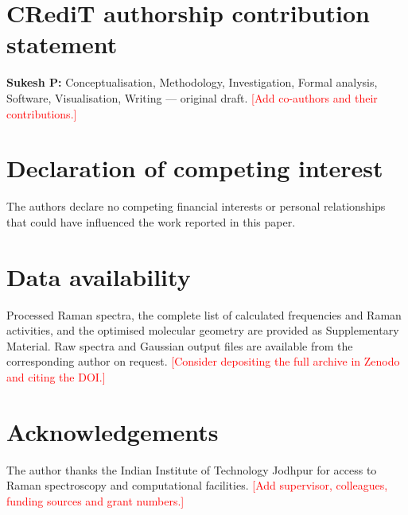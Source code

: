 \documentclass[11pt,a4paper]{article}
\newcommand{\authorcheck}[1]{\textcolor{red}{[#1]}}
\begin{document}
\section*{CRediT authorship contribution statement}
\textbf{Sukesh P:} Conceptualisation, Methodology, Investigation, Formal
analysis, Software, Visualisation, Writing --- original draft.
\authorcheck{Add co-authors and their contributions.}

\section*{Declaration of competing interest}
The authors declare no competing financial interests or personal relationships
that could have influenced the work reported in this paper.

\section*{Data availability}
Processed Raman spectra, the complete list of calculated frequencies and Raman
activities, and the optimised molecular geometry are provided as Supplementary
Material. Raw spectra and Gaussian output files are available from the
corresponding author on request.
\authorcheck{Consider depositing the full archive in Zenodo and citing the DOI.}

\section*{Acknowledgements}
The author thanks the Indian Institute of Technology Jodhpur for access to Raman
spectroscopy and computational facilities.
\authorcheck{Add supervisor, colleagues, funding sources and grant numbers.}
\end{document}

